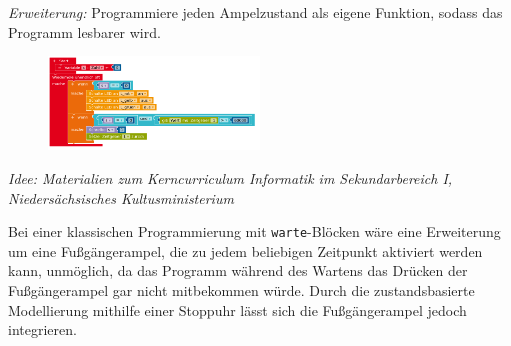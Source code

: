 \begin{aufgabe}
\begin{enumerate}[label=\alph*), itemsep=0mm, parsep=0mm]
		\emph{Erweiterung:} Programmiere jeden Ampelzustand als eigene Funktion, sodass das Programm lesbarer wird.
		\begin{figure}[H]
			\centering
			\includegraphics[width=0.5\textwidth]{./pics/ampel-automat-start.png}
		\end{figure} 
	\end{enumerate}
	{\scriptsize\emph{Idee: Materialien zum Kerncurriculum Informatik im Sekundarbereich I, Niedersächsisches Kultusministerium}}
\end{aufgabe}

Bei einer klassischen Programmierung mit \texttt{warte}-Blöcken wäre eine Erweiterung um eine Fußgängerampel, die zu jedem beliebigen Zeitpunkt aktiviert werden kann, unmöglich, da das Programm während des Wartens das Drücken der Fußgängerampel gar nicht mitbekommen würde. Durch die zustandsbasierte Modellierung mithilfe einer Stoppuhr lässt sich die Fußgängerampel jedoch integrieren. 


